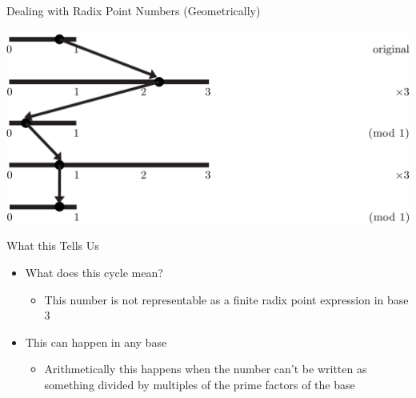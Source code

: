 \documentclass{beamer}
\begin{document}
        \begin{frame}{Dealing with Radix Point Numbers (Geometrically)}
          \begin{example}
            \includegraphics[width=\textwidth,height=0.75\textheight]{images/Ternary/5}
          \end{example}
        \end{frame}

        \begin{frame}{What this Tells Us}
          \begin{itemize}
            \item What does this cycle mean?
            \begin{itemize}
              \item This number is not representable as a finite radix point expression in base 3
            \end{itemize}
            \item This can happen in any base
            \begin{itemize}
              \item Arithmetically this happens when the number can't be written as something divided by multiples of the prime factors of the base
            \end{itemize}
          \end{itemize}
        \end{frame}
\end{document}
